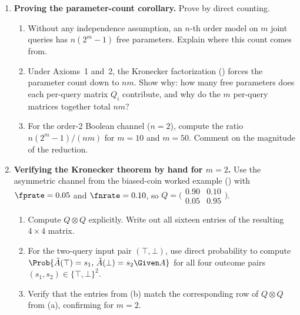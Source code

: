 \begin{enumerate}
\item \exstarstar
\textbf{Proving the parameter-count corollary.}
Prove  by direct counting.
\begin{enumerate}
  \item[(a)] Without any independence assumption, an $n$-th order model on
    $m$ joint queries has $n(2^m - 1)$ free parameters. Explain where this
    count comes from.
  \item[(b)] Under Axioms~1 and~2, the Kronecker factorization
    () forces the parameter count down to $nm$.
    Show why: how many free parameters does each per-query matrix
    $Q_i$ contribute, and why do the $m$ per-query matrices together
    total $nm$?
  \item[(c)] For the order-2 Boolean channel ($n = 2$), compute the ratio
    $n(2^m - 1) / (nm)$ for $m = 10$ and $m = 50$. Comment on the
    magnitude of the reduction.
\end{enumerate}

\item \exstarstar
\textbf{Verifying the Kronecker theorem by hand for $m = 2$.}
Use the asymmetric channel from the biased-coin worked example
() with $\fprate = 0.05$ and $\fnrate = 0.10$,
so $Q = \bigl(\begin{smallmatrix} 0.90 & 0.10 \\ 0.05 & 0.95 \end{smallmatrix}\bigr)$.
\begin{enumerate}
  \item[(a)] Compute $Q \otimes Q$ explicitly. Write out all sixteen entries
    of the resulting $4 \times 4$ matrix.
  \item[(b)] For the two-query input pair $(\top, \bot)$, use direct
    probability to compute $\Prob{\tilde{A}(\top) = s_1,\, \tilde{A}(\bot) = s_2
    \Given A}$ for all four outcome pairs $(s_1, s_2) \in \{\top,\bot\}^2$.
  \item[(c)] Verify that the entries from (b) match the corresponding row of
    $Q \otimes Q$ from (a), confirming  for $m = 2$.
\end{enumerate}


\end{enumerate}
